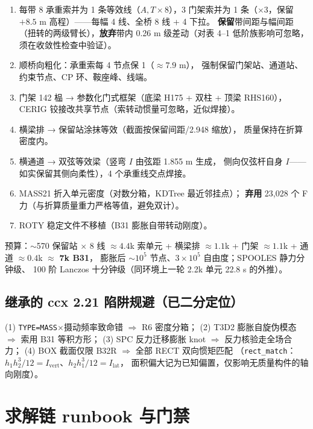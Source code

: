 \documentclass[11pt,a4paper]{ctexart}
\begin{document}
\begin{enumerate}
  \item[\textbf{R1}] 每带 8 承重索并为 1 条等效线（$A,T\times8$），3 门架索并为
        1 条（$\times3$，保留 $+8.5$ m 高程）——每幅 4 线、全桥 8 线 + 4 下拉。
        \textbf{保留}带间距与幅间距（扭转的两级臂长），\textbf{放弃}带内 0.26 m
        级差动（对表 4--1 低阶族影响可忽略，须在收敛性检查中验证）。
  \item[\textbf{R2}] 顺桥向粗化：承重索每 4 节点保 1（$\approx7.9$ m），
        强制保留门架站、通道站、约束节点、CP 环、鞍座峰、线端。
  \item[\textbf{R3}] 门架 142 榀 → 参数化门式框架（底梁 H175 + 双柱 + 顶梁
        RHS160），CERIG 铰接改共享节点（索转动惯量可忽略，近似焊接）。
  \item[\textbf{R4}] 横梁排 → 保留站涂抹等效（截面按保留间距/2.948 缩放），
        质量保持在折算密度内。
  \item[\textbf{R5}] 横通道 → 双弦等效梁（竖弯 $I$ 由弦距 1.855 m 生成，
        侧向仅弦杆自身 $I$——如实保留其侧向柔性），4 个承重线交点焊接。
  \item[\textbf{R6}] MASS21 折入单元密度（对数分箱，KDTree 最近邻挂点）；
        \textbf{弃用} 23{,}028 个 F 力（与折算质量重力严格等值，避免双计）。
  \item[\textbf{R7}] ROTY 稳定文件不移植（B31 膨胀自带转动刚度）。
\end{enumerate}

预算：$\sim$570 保留站 $\times$ 8 线 $\approx 4.4$k 索单元 + 横梁排 $\approx1.1$k
+ 门架 $\approx1.1$k + 通道 $\approx0.4$k $\approx$ \textbf{7k B31}，
膨胀后 $\sim10^5$ 节点、$3\times10^5$ 自由度；SPOOLES 静力分钟级、
100 阶 Lanczos 十分钟级（同环境上一轮 2.2k 单元 22.8 s 的外推）。

\subsection{继承的 ccx 2.21 陷阱规避（已二分定位）}

(1) \texttt{TYPE=MASS}$\times$摄动频率致命错 $\Rightarrow$ R6 密度分箱；
(2) T3D2 膨胀自旋伪模态 $\Rightarrow$ 索用 B31 等积方形；
(3) SPC 反力迁移膨胀 knot $\Rightarrow$ 反力核验走全场合力；
(4) BOX 截面仅限 B32R $\Rightarrow$ 全部 RECT 双向惯矩匹配
（\texttt{rect\_match}：$h_1h_2^3/12=I_{\text{vert}}$、$h_2h_1^3/12=I_{\text{lat}}$，
面积偏大记为已知偏置，仅影响无质量构件的轴向刚度）。

\section{求解链 runbook 与门禁}
\label{sec:runbook}
\end{document}
